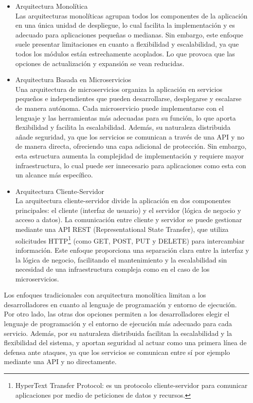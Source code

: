 \begin{itemize}
\item Arquitectura Monolítica\\
Las arquitecturas monolíticas agrupan todos los componentes de la aplicación en una única unidad de despliegue, lo cual facilita la implementación y es adecuado para aplicaciones pequeñas o medianas. Sin embargo, este enfoque suele presentar limitaciones en cuanto a flexibilidad y escalabilidad, ya que todos los módulos están estrechamente acoplados. Lo que provoca que las opciones de actualización y expansión se vean reducidas.

\item Arquitectura Basada en Microservicios\\
Una arquitectura de microservicios organiza la aplicación en servicios pequeños e independientes que pueden desarrollarse, desplegarse y escalarse de manera autónoma. Cada microservicio puede implementarse con el lenguaje y las herramientas más adecuadas para su función, lo que aporta flexibilidad y facilita la escalabilidad. Además, su naturaleza distribuida añade seguridad, ya que los servicios se comunican a través de una API y no de manera directa, ofreciendo una capa adicional de protección. Sin embargo, esta estructura aumenta la complejidad de implementación y requiere mayor infraestructura, lo cual puede ser innecesario para aplicaciones como esta con un alcance más específico\cite{RedHat2023}\cite{lopez2017arquitectura}.

\item Arquitectura Cliente-Servidor\\
La arquitectura cliente-servidor divide la aplicación en dos componentes principales: el cliente (interfaz de usuario) y el servidor (lógica de negocio y acceso a datos). La comunicación entre cliente y servidor se puede gestionar mediante una API REST (Representational State Transfer), que utiliza solicitudes HTTP\footnote{HyperText Transfer Protocol: es un protocolo cliente-servidor para comunicar aplicaciones por medio de peticiones de datos y recursos.} (como GET, POST, PUT y DELETE) para intercambiar información. Este enfoque proporciona una separación clara entre la interfaz y la lógica de negocio, facilitando el mantenimiento y la escalabilidad sin necesidad de una infraestructura compleja como en el caso de los microservicios.

\end{itemize}

Los enfoques tradicionales con arquitectura monolítica limitan a los desarrolladores en cuanto al lenguaje de programación y entorno de ejecución. Por otro lado, las otras dos opciones permiten a los desarrolladores elegir el lenguaje de programación y el entorno de ejecución más adecuado para cada servicio. Además, por su naturaleza distribuida facilitan la escalabilidad y la flexibilidad del sistema, y aportan seguridad al actuar como una primera línea de defensa ante ataques, ya que los servicios se comunican entre sí por ejemplo mediante una API y no directamente. 

